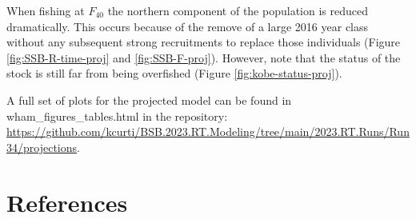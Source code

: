 \documentclass[
]{article}
\begin{document}
When fishing at \(F_{40}\) the northern component of the population is reduced dramatically. This occurs because of the remove of a large 2016 year class without any subsequent strong recruitments to replace those individuals (Figure \ref{fig:SSB-R-time-proj} and \ref{fig:SSB-F-proj}). However, note that the status of the stock is still far from being overfished (Figure \ref{fig:kobe-status-proj}).

A full set of plots for the projected model can be found in wham\_figures\_tables.html in the repository: \url{https://github.com/kcurti/BSB.2023.RT.Modeling/tree/main/2023.RT.Runs/Run34/projections}.

\hypertarget{references}{%
\section*{References}\label{references}}
\end{document}
